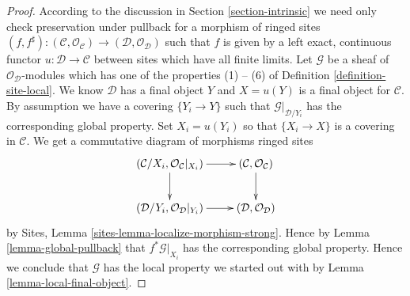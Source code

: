 \documentclass[10pt,a4paper]{amsart}
\theoremstyle{plain}
\theoremstyle{definition}
\theoremstyle{remark}
\numberwithin{equation}{subsection}
\begin{document}
\begin{proof}
According to the discussion in Section \ref{section-intrinsic}
we need only check preservation under pullback for a morphism of ringed sites
$(f, f^\sharp) :
(\mathcal{C}, \mathcal{O}_\mathcal{C})
\to
(\mathcal{D}, \mathcal{O}_\mathcal{D})$
such that $f$ is given by a left exact, continuous functor
$u : \mathcal{D} \to \mathcal{C}$ between sites which have
all finite limits.
Let $\mathcal{G}$ be a sheaf of $\mathcal{O}_\mathcal{D}$-modules
which has one of the properties (1) -- (6) of
Definition \ref{definition-site-local}.
We know $\mathcal{D}$ has a final object $Y$ and $X = u(Y)$
is a final object for $\mathcal{C}$. By assumption we have
a covering $\{Y_i \to Y\}$ such that $\mathcal{G}|_{\mathcal{D}/Y_i}$
has the corresponding global property. Set $X_i = u(Y_i)$ so
that $\{X_i \to X\}$ is a covering in $\mathcal{C}$.
We get a commutative diagram of morphisms ringed sites
$$
\xymatrix{
(\mathcal{C}/X_i, \mathcal{O}_\mathcal{C}|_{X_i}) \ar[r] \ar[d] &
(\mathcal{C}, \mathcal{O}_\mathcal{C}) \ar[d] \\
(\mathcal{D}/Y_i, \mathcal{O}_\mathcal{D}|_{Y_i}) \ar[r] &
(\mathcal{D}, \mathcal{O}_\mathcal{D})
}
$$
by Sites, Lemma \ref{sites-lemma-localize-morphism-strong}.
Hence by Lemma \ref{lemma-global-pullback}
that $f^*\mathcal{G}|_{X_i}$ has the corresponding global
property. Hence we conclude that $\mathcal{G}$ has the local
property we started out with by Lemma \ref{lemma-local-final-object}.
\end{proof}
\end{document}
